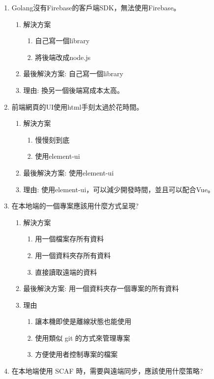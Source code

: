 \documentclass{report}
\begin{document}
\begin{enumerate}
	\item Golang沒有Firebase的客戶端SDK，無法使用Firebase。
	  \begin{enumerate}
			\item 解決方案
				\begin{enumerate}
					\item 自己寫一個library
					\item 將後端改成node.js
				\end{enumerate}
			\item 最後解決方案: 自己寫一個library
			\item 理由: 換另一個後端寫成本太高。
		\end{enumerate}
	\item 前端網頁的UI使用html手刻太過於花時間。
		\begin{enumerate}
			\item 解決方案
				\begin{enumerate}
					\item 慢慢刻到底
					\item 使用element-ui
				\end{enumerate}
			\item 最後解決方案: 使用element-ui
			\item 理由: 使用element-ui，可以減少開發時間，並且可以配合Vue。
		\end{enumerate}
	\item 在本地端的一個專案應該用什麼方式呈現?
		\begin{enumerate}
			\item 解決方案
				\begin{enumerate}
					\item 用一個檔案存所有資料
					\item 用一個資料夾存所有資料
					\item 直接讀取遠端的資料
				\end{enumerate}
			\item 最後解決方案: 用一個資料夾存一個專案的所有資料
			\item 理由
				\begin{enumerate}
					\item 讓本機即使是離線狀態也能使用
					\item 使用類似 git 的方式來管理專案
				\item 方便使用者控制專案的檔案
				\end{enumerate}
		\end{enumerate}
		\item 在本地端使用 SCAF 時，需要與遠端同步，應該使用什麼策略?

\end{enumerate}
\end{document}
